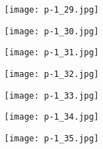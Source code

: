 \clearpage


\begin{figure}
    \begin{center}
        \texttt{[image: p-1\_29.jpg]}
        \caption{}
    \end{center}
\end{figure}

\clearpage


\begin{figure}
    \begin{center}
        \texttt{[image: p-1\_30.jpg]}
        \caption{}
    \end{center}
\end{figure}

\clearpage


\begin{figure}
    \begin{center}
        \texttt{[image: p-1\_31.jpg]}
        \caption{}
    \end{center}
\end{figure}

\clearpage


\begin{figure}
    \begin{center}
        \texttt{[image: p-1\_32.jpg]}
        \caption{}
    \end{center}
\end{figure}

\clearpage


\begin{figure}
    \begin{center}
        \texttt{[image: p-1\_33.jpg]}
        \caption{}
    \end{center}
\end{figure}

\clearpage


\begin{figure}
    \begin{center}
        \texttt{[image: p-1\_34.jpg]}
        \caption{}
    \end{center}
\end{figure}

\clearpage


\begin{figure}
    \begin{center}
        \texttt{[image: p-1\_35.jpg]}
        \caption{}
    \end{center}
\end{figure}

